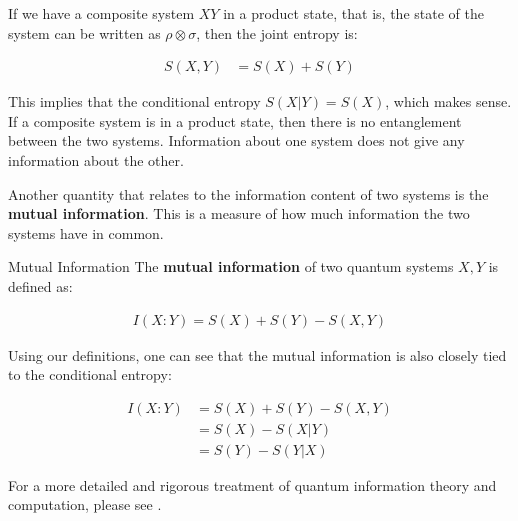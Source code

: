 \begin{example}
    If we have a composite system $XY$ in a product state, that is, the state of the system can be written as $\rho \otimes \sigma$, then the joint entropy is:
\end{example}

\begin{align}
    S(X,Y) &= S(X) + S(Y)
\end{align}

This implies that the conditional entropy $S(X|Y) = S(X)$, which makes sense. If a composite system is in a product state, then there is no entanglement between the two systems. Information about one system does not give any information about the other.

Another quantity that relates to the information content of two systems is the \textbf{mutual information}. This is a measure of how much information the two systems have in common.

\begin{definition}{Mutual Information}
    The \textbf{mutual information} of two quantum systems $X,Y$ is defined as:
    
    \begin{align}
        I(X:Y) = S(X) + S(Y) - S(X,Y)
    \end{align}
\end{definition}

Using our definitions, one can see that the mutual information is also closely tied to the conditional entropy:

\begin{align}
        I(X:Y) &= S(X) + S(Y) - S(X,Y) \\ 
        &= S(X) - S(X|Y) \\ 
        &= S(Y) - S(Y|X)
\end{align}

For a more detailed and rigorous treatment of quantum information theory and computation, please see \cite{nielsen_quantum_2010}.
